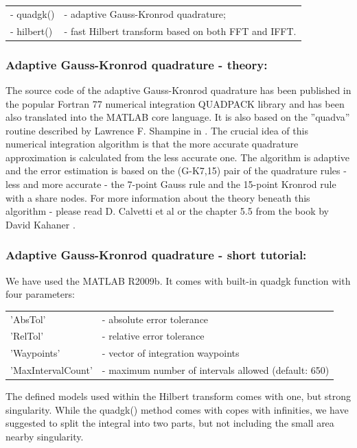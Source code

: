 \documentclass[12pt,twoside,a4paper]{article}
\numberwithin{equation}{subsection}
\numberwithin{figure}{subsection}
\begin{document}
\begin{tabular}{l l}
  - quadgk() &- adaptive Gauss-Kronrod quadrature; \\
  - hilbert() &- fast Hilbert transform based on both FFT and IFFT. \\
\end{tabular}


\subsubsection*{Adaptive Gauss-Kronrod quadrature - theory:}

The source code of the adaptive Gauss-Kronrod quadrature has been published in the popular Fortran 77 numerical integration
QUADPACK library and has been also translated into the MATLAB core language. It is also based on the ''quadva'' routine described by
Lawrence F. Shampine in \cite{shampine_vectorized}. The crucial idea of this numerical integration algorithm is that the more accurate
quadrature approximation is calculated from the less accurate one. The algorithm is adaptive and the error estimation is based on the
(G-K7,15) pair of the quadrature rules - less and more accurate - the 7-point Gauss rule and the 15-point Kronrod rule with a share nodes.
For more information about the theory beneath this algorithm - please read D. Calvetti et al \cite{calvetti_computation} or the chapter 5.5
from the book by David Kahaner \cite{kahaner_numerical}.

\subsubsection*{Adaptive Gauss-Kronrod quadrature - short tutorial:}

We have used the MATLAB \textregistered R2009b. It comes with built-in quadgk function with four parameters:


\begin{tabular}{l l}
  'AbsTol'           & - absolute error tolerance \\
  'RelTol'           & - relative error tolerance \\
  'Waypoints'        & - vector of integration waypoints \\
  'MaxIntervalCount' & - maximum number of intervals allowed (default: 650) \\
\end{tabular}

The defined models used within the Hilbert transform comes with one, but strong singularity. While the quadgk() method comes with
copes with infinities, we have suggested to split the integral into two parts, but not including the small area nearby singularity.
\end{document}

